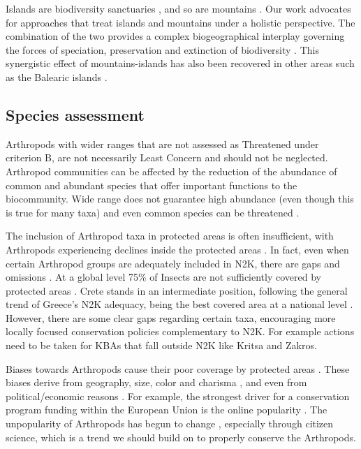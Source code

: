 Islands are biodiversity sanctuaries \parencite{whittaker2007island}, and
so are mountains \parencite{rahbek2019humboldts}. Our work advocates for approaches that
treat islands and mountains under a holistic perspective. The combination of
the two provides a complex biogeographical interplay governing the forces of
speciation, preservation and extinction of biodiversity \parencite{steinbauer2016topography-driven}.
This synergistic effect of mountains-islands has also been recovered in other
areas such as the Balearic islands \parencite{guardiola2023are-mediterranean}.

    \subsection{Species assessment}
    \label{subsec:arthropods-species-assessment-disc}

Arthropods with wider ranges that are not assessed as Threatened under
criterion B, are not necessarily Least Concern and should not be neglected.
Arthropod communities can be affected by the reduction of the abundance of
common and abundant species that offer important functions to the biocommunity.
Wide range does not guarantee high abundance (even though this is true for many
taxa) and even common species can be threatened \parencite{habel2018vanishing,klink2023disproportionate}.

The inclusion of Arthropod taxa in protected areas is often insufficient, with
Arthropods experiencing declines inside the protected areas \parencite{borges2005ranking,chowdhury2023protected,harry2019protected,rada2019protected}.
In fact, even when certain Arthropod groups are adequately included in N2K,
there are gaps and omissions \parencite{sanchez-fernandez2008are-the-endemic,verovnik2011is-the-natura}.
At a global level 75\% of Insects are not sufficiently covered by protected
areas \parencite{chowdhury2023three-quarters}. Crete stands in an intermediate position,
following the general trend of Greece’s N2K adequacy, being the best covered
area at a national level \parencite{kougioumoutzis2021plant,spiliopoulou2021the-natura}.
However, there are some clear gaps regarding certain taxa, encouraging more
locally focused conservation policies complementary to N2K. For example actions
need to be taken for KBAs that fall outside N2K like Kritsa and Zakros.

Biases towards Arthropods cause their poor coverage by protected
areas \parencite{chowdhury2023protected,damen2013protected,delso2021protected}. These
biases derive from geography, size, color and charisma \parencite{cardoso2012habitats,mammola2020towards,wang2021out-of-sight},
and even from political/economic reasons \parencite{dias-silva2021protected}. For example,
the strongest driver for a conservation program funding within the European
Union is the online popularity \parencite{mammola2020towards}. The unpopularity of
Arthropods has begun to change \parencite{wagner2021insect}, especially through citizen
science, which is a trend we should build on to properly conserve the Arthropods.


